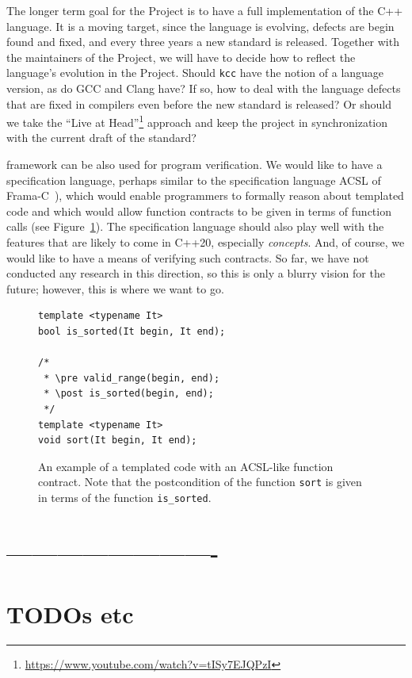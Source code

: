 \documentclass[nolot,nolof,nocover,printed]{fithesis3}
\newcommand{\kcc}{\texttt{kcc}\xspace}
\begin{document}
The longer term goal for the Project is to have a full implementation of the C++ language. It is a moving target, since the language is evolving, defects are begin found and fixed, and every three years a new standard is released. Together with the maintainers of the Project, we will have to decide how to reflect the language's evolution in the Project. Should \kcc have the notion of a language version, as do GCC and Clang have? If so, how to deal with the language defects that are fixed in compilers even before the new standard is released? Or should we take the \enquote{Live at Head}\footnote{\url{https://www.youtube.com/watch?v=tISy7EJQPzI}} approach and keep the project in synchronization with the current draft of the standard?

\K framework can be also used for program verification. We would like to have a specification language, perhaps similar to the specification language ACSL of Frama-C~\cite{Cuoq2012}), which would enable programmers to formally reason about templated code and which would allow function contracts to be given in terms of function calls (see Figure~\ref{fig:contractsExample}). The specification language should also play well with the features that are likely to come in C++20, especially \textit{concepts}. And, of course, we would like to have a means of verifying such contracts. So far, we have not conducted any research in this direction, so this is only a blurry vision for the future; however, this is where we want to go.

\begin{figure}
\begin{lstlisting}
template <typename It>
bool is_sorted(It begin, It end);

/*
 * \pre valid_range(begin, end);
 * \post is_sorted(begin, end);
 */
template <typename It>
void sort(It begin, It end);
\end{lstlisting}
\caption{An example of a templated code with an ACSL-like function contract. Note that the postcondition of the function \texttt{sort} is given in terms of the function \texttt{is\_sorted}.}
\label{fig:contractsExample}
\end{figure}

\ifshowoldstuff

\chapter{-------------------------}
\chapter{TODOs etc}
\end{document}
